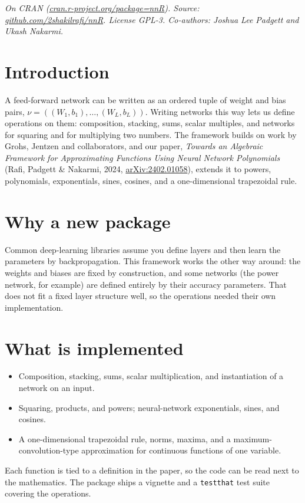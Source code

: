 

\textit{On CRAN (\href{https://cran.r-project.org/package=nnR}{cran.r-project.org/package=nnR}). Source: \href{https://github.com/2shakilrafi/nnR}{github.com/2shakilrafi/nnR}. License GPL-3. Co-authors: Joshua Lee Padgett and Ukash Nakarmi.}


\section{Introduction}
A feed-forward network can be written as an ordered tuple of weight and bias pairs, $\nu=((W_1,b_1),\dots,(W_L,b_L))$. Writing networks this way lets us define operations on them: composition, stacking, sums, scalar multiples, and networks for squaring and for multiplying two numbers. The framework builds on work by Grohs, Jentzen and collaborators, and our paper, \textit{Towards an Algebraic Framework for Approximating Functions Using Neural Network Polynomials} (Rafi, Padgett \& Nakarmi, 2024, \href{https://doi.org/10.48550/arXiv.2402.01058}{arXiv:2402.01058}), extends it to powers, polynomials, exponentials, sines, cosines, and a one-dimensional trapezoidal rule.

\section{Why a new package}
Common deep-learning libraries assume you define layers and then learn the parameters by backpropagation. This framework works the other way around: the weights and biases are fixed by construction, and some networks (the power network, for example) are defined entirely by their accuracy parameters. That does not fit a fixed layer structure well, so the operations needed their own implementation.

\section{What is implemented}
\begin{itemize}
\item Composition, stacking, sums, scalar multiplication, and instantiation of a network on an input.
\item Squaring, products, and powers; neural-network exponentials, sines, and cosines.
\item A one-dimensional trapezoidal rule, norms, maxima, and a maximum-convolution-type approximation for continuous functions of one variable.
\end{itemize}
Each function is tied to a definition in the paper, so the code can be read next to the mathematics. The package ships a vignette and a \texttt{testthat} test suite covering the operations.

